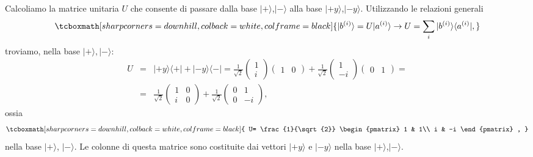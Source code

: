 \documentclass[a4paper,12pt,oneside]{book}
\begin{document}
Calcoliamo la matrice unitaria $U$ che consente di passare dalla base $| + \rangle $,$| - \rangle $ alla base $| +y \rangle $,$| -y \rangle$. Utilizzando le relazioni generali
		\begin{equation}
		\tcboxmath[sharp corners=downhill, colback=white, colframe=black]{
			| b^{(i)}\rangle =U| a^{(i)} \rangle \rightarrow U = \sum \limits_i | b^{(i)}\rangle \langle a^{(i)}| ,
			}
	\end{equation}
troviamo, nella base $| + \rangle,| - \rangle$:
	\begin{eqnarray}
		U &=& | +y \rangle \langle + | + |-y \rangle \langle - |=
		\frac{1}{\sqrt{2}}
		\begin{pmatrix}
		1\\
		i
		\end{pmatrix}
		\begin{pmatrix}
		1 & 0
		\end{pmatrix}+
		\frac{1}{\sqrt{2}}
		\begin{pmatrix}
		1\\
		-i
		\end{pmatrix}
		\begin{pmatrix}
		0 & 1
		\end{pmatrix}= \nonumber \\
		&=&\frac{1}{\sqrt{2}}
		\begin{pmatrix}
		1 & 0\\
		i & 0
		\end{pmatrix}+
		\frac{1}{\sqrt{2}}
		\begin{pmatrix}
		0 & 1\\
		0 & -i
		\end{pmatrix} ,
	\end{eqnarray}
ossia
	\begin{equation}
		\tcboxmath[sharp corners=downhill, colback=white, colframe=black]{
			U= \frac{1}{\sqrt{2}}
			\begin{pmatrix}
			1 & 1\\
			i & -i
			\end{pmatrix} ,
			}
	\end{equation}
nella base $| + \rangle $, $| - \rangle $. Le colonne di questa matrice sono costituite dai vettori $| +y \rangle $ e $| -y \rangle $ nella base $| + \rangle $,$| - \rangle $.\\
\end{document}
